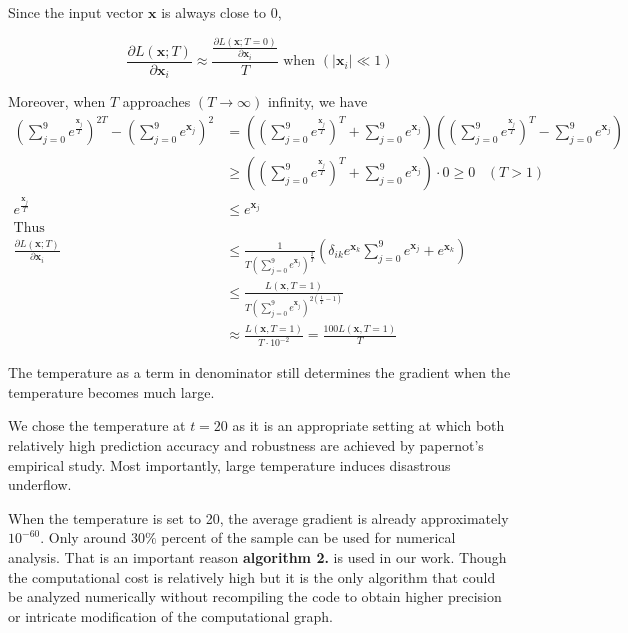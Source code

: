 \documentclass{article}
\begin{document}
Since the input vector $\mathbf{x}$ is always close to 0,

\begin{equation}
	\frac{\partial L(\mathbf{x};T)}{\partial \mathbf{x}_i}
	\approx \frac{\frac{\partial L(\mathbf{x};T=0)}{\partial \mathbf{x}_i}}{T} \text{ when } (\mid \mathbf{x}_i \mid \ll 1)
\end{equation}

Moreover, when $T$ approaches $(T \rightarrow \infty)$ infinity, we have 
\begin{align*}
	(\sum_{j=0}^9 e^{\frac{\mathbf{x}_j}{T}})^{2T} -
	(\sum_{j=0}^9 e^{\mathbf{x}_j})^{2}
	&=((\sum_{j=0}^9 e^{\frac{\mathbf{x}_j}{T}})^T+
	\sum_{j=0}^9 e^{\mathbf{x}_j})((\sum_{j=0}^9 e^{\frac{\mathbf{x}_j}{T}})^T-\sum_{j=0}^9 e^{\mathbf{x}_j})\\
	&\ge((\sum_{j=0}^9 e^{\frac{\mathbf{x}_j}{T}})^T+
	\sum_{j=0}^9 e^{\mathbf{x}_j})\cdot 0 \ge 0 \hspace{10pt} (T > 1)\\
	e^{\frac{\mathbf{x}_j}{T}} &\le e^{\mathbf{x}_j}\\
	\text{Thus}\hspace{3cm} &\\
	\frac{\partial L(\mathbf{x};T)}{\partial \mathbf{x}_i} &\le 
	\frac{1}{T(\sum_{j=0}^9 e^{\mathbf{x}_j})^{\frac{2}{T}}} (
	\delta_{ik} e^{\mathbf{x}_k}
	\sum_{j=0}^9 e^{\mathbf{x}_j}+
	e^{\mathbf{x}_k} )\\
	&\le \frac{L(\mathbf{x},T=1)}{T(\sum_{j=0}^9 e^{\mathbf{x}_j})^{2(\frac{1}{T}-1)}}\\
	&\approx 
	\frac{L(\mathbf{x},T=1)}{T\cdot 10^{-2}} = 
	\frac{100L(\mathbf{x},T=1)}{T}
\end{align*}

The temperature as a term in denominator still determines the gradient when the temperature becomes much large.

We chose the temperature at $t=20$ as it is an appropriate setting at which both relatively high prediction accuracy and robustness are achieved by papernot's empirical study\cite{Papernot}. Most importantly, large temperature induces disastrous underflow. 

When the temperature is set to 20, the average gradient is already approximately $10^{-60}$. Only around $30\%$ percent of the sample can be used for numerical analysis. That is an important reason \textbf{algorithm 2.} is used in our work. 
Though the computational cost is relatively high but it is the only algorithm that could be analyzed numerically without recompiling the code to obtain higher precision or intricate modification of the computational graph.
\end{document}
